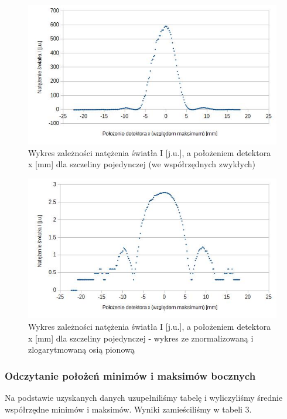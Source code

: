 \documentclass{article}
\begin{document}
\begin{figure}[h]
	\centering
	\includegraphics[scale=0.8]{ch01a}
	\caption{Wykres zależności natężenia światła I [j.u.], a położeniem detektora x [mm] dla szczeliny pojedynczej (we współrzędnych zwykłych)}
\end{figure}

\clearpage

\begin{figure}[h]
	\centering
	\includegraphics[scale=0.8]{ch02a}
	\caption{Wykres zależności natężenia światła I [j.u.], a położeniem detektora x [mm] dla szczeliny pojedynczej - wykres ze znormalizowaną i zlogarytmowaną osią pionową}
\end{figure}

\subsubsection{Odczytanie położeń minimów i maksimów bocznych}
Na podstawie uzyskanych danych uzupełniliśmy tabelę i wyliczyliśmy średnie współrzędne minimów i maksimów. Wyniki zamieściliśmy w tabeli 3.
\end{document}
